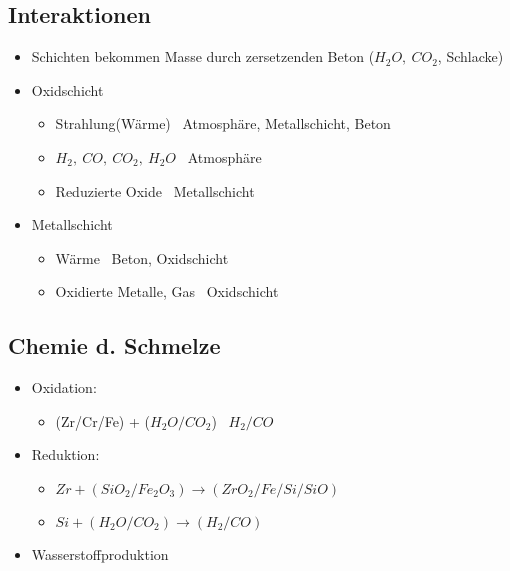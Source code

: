 \documentclass[12pt]{article}
\begin{document}
\subsection{Interaktionen}
\begin{itemize}
  \item Schichten bekommen Masse durch zersetzenden Beton (\(H_2O,\ CO_2\), Schlacke)
  \item Oxidschicht
  \begin{itemize}
    \item Strahlung(Wärme) \textrightarrow\ Atmosphäre, Metallschicht, Beton
    \item \(H_2,\ CO,\ CO_2,\ H_2O\) \textrightarrow\ Atmosphäre
    \item Reduzierte Oxide \textrightarrow\ Metallschicht
  \end{itemize}
  \item Metallschicht
  \begin{itemize}
    \item Wärme \textrightarrow\ Beton, Oxidschicht
    \item Oxidierte Metalle, Gas \textrightarrow\ Oxidschicht
  \end{itemize}
\end{itemize}

\subsection{Chemie d. Schmelze}
\begin{itemize}
  \item Oxidation:
  \begin{itemize}
    \item (Zr/Cr/Fe) + (\(H_2O/CO_2\)) \textrightarrow\ \(H_2/CO\)
  \end{itemize}
  \item Reduktion:
  \begin{itemize}
    \item \(Zr + (SiO_2/Fe_2O_3) \rightarrow (ZrO_2/Fe/Si/SiO)\)
    \item \(Si + (H_2O/CO_2) \rightarrow (H_2/CO)\)
  \end{itemize}
  \item Wasserstoffproduktion
\end{itemize}
\end{document}
